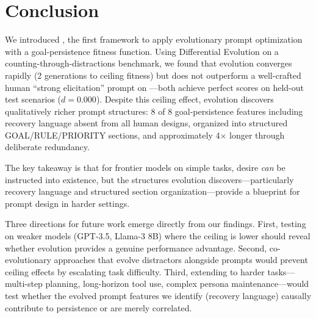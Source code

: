 \section{Conclusion}
\label{sec:conclusion}

We introduced \evodesire, the first framework to apply evolutionary prompt optimization with a goal-persistence fitness function.
Using Differential Evolution on a counting-through-distractions benchmark, we found that evolution converges rapidly (2 generations to ceiling fitness) but does not outperform a well-crafted human ``strong elicitation'' prompt on \gptmini---both achieve perfect scores on held-out test scenarios ($d = 0.000$).
Despite this ceiling effect, evolution discovers qualitatively richer prompt structures: 8 of 8 goal-persistence features including recovery language absent from all human designs, organized into structured GOAL/RULE/PRIORITY sections, and approximately 4$\times$ longer through deliberate redundancy.

The key takeaway is that for frontier models on simple tasks, desire \emph{can} be instructed into existence, but the structures evolution discovers---particularly recovery language and structured section organization---provide a blueprint for prompt design in harder settings.

Three directions for future work emerge directly from our findings.
First, testing on weaker models (GPT-3.5, Llama-3 8B) where the ceiling is lower should reveal whether evolution provides a genuine performance advantage.
Second, co-evolutionary approaches that evolve distractors alongside prompts \citep{aegis2025} would prevent ceiling effects by escalating task difficulty.
Third, extending to harder tasks---multi-step planning, long-horizon tool use, complex persona maintenance---would test whether the evolved prompt features we identify (\eg recovery language) causally contribute to persistence or are merely correlated.
